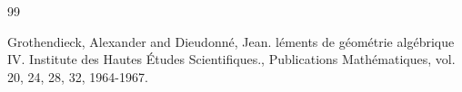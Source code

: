 \begin{thebibliography}{99}

Grothendieck, Alexander and Dieudonn{\'e}, Jean.
l{\'e}ments de g{\'e}om{\'e}trie alg{\'e}brique {IV}.
\newblock Institute des {H}autes {\'E}tudes {S}cientifiques.,
Publications {M}ath{\'e}matiques, vol. 20, 24, 28, 32, 1964-1967.

\end{thebibliography}
